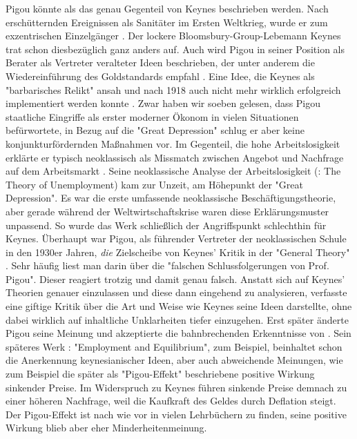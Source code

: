 Pigou könnte als das genau Gegenteil von Keynes beschrieben werden. Nach erschütternden Ereignissen als Sanitäter im Ersten Weltkrieg, wurde er zum exzentrischen Einzelgänger \parencite[S. 153]{Johnson1960}. Der lockere Bloomsbury-Group-Lebemann Keynes trat schon diesbezüglich ganz anders auf. Auch wird Pigou in seiner Position als Berater als Vertreter veralteter Ideen beschrieben, der unter anderem die Wiedereinführung des Goldstandards empfahl \parencite[S. 232]{Cansier1989}. Eine Idee, die Keynes als "barbarisches Relikt" ansah und nach 1918 auch nicht mehr wirklich erfolgreich implementiert werden konnte \parencite[S. 232]{Cansier1989}. Zwar haben wir soeben gelesen, dass Pigou staatliche Eingriffe als erster moderner Ökonom in vielen Situationen befürwortete, in Bezug auf die "Great Depression" schlug er aber keine konjunkturfördernden Maßnahmen vor. Im Gegenteil, die hohe Arbeitslosigkeit erklärte er typisch neoklassisch als Missmatch zwischen Angebot und Nachfrage auf dem Arbeitsmarkt \parencite[S. 232]{Cansier1989}. Seine neoklassische Analyse der Arbeitslosigkeit (\textcite{Pigou1933}: The Theory of Unemployment) kam zur Unzeit, am Höhepunkt der "Great Depression". Es war die erste umfassende neoklassische Beschäftigungstheorie, aber gerade während der Weltwirtschaftskrise waren diese Erklärungsmuster unpassend. So wurde das Werk schließlich der Angriffspunkt schlechthin für Keynes. Überhaupt war Pigou, als führender Vertreter der neoklassischen Schule in den 1930er Jahren, \textit{die} Zielscheibe von Keynes' Kritik in der "General Theory" \parencite[S. 154]{Johnson1960}. Sehr häufig liest man darin über die "falschen Schlussfolgerungen von Prof. Pigou". Dieser reagiert trotzig und damit genau falsch. Anstatt sich auf Keynes' Theorien genauer einzulassen und diese dann eingehend zu analysieren, verfasste \textcite{Pigou1936} eine giftige Kritik über die Art und Weise wie Keynes seine Ideen darstellte, ohne dabei wirklich auf inhaltliche Unklarheiten tiefer einzugehen. Erst später änderte Pigou seine Meinung und akzeptierte die bahnbrechenden Erkenntnisse von \textcite{Keynes1936} \parencite[S. 154]{Johnson1960}. Sein späteres Werk \textcite{Pigou1941}: "Employment and Equilibrium", zum Beispiel, beinhaltet schon die Anerkennung keynesianischer Ideen, aber auch abweichende Meinungen, wie zum Beispiel die später als "Pigou-Effekt" beschriebene positive Wirkung sinkender Preise. Im Widerspruch zu Keynes führen sinkende Preise demnach zu einer höheren Nachfrage, weil die Kaufkraft des Geldes durch Deflation steigt. Der Pigou-Effekt ist nach wie vor in vielen Lehrbüchern zu finden, seine positive Wirkung blieb aber eher Minderheitenmeinung.


